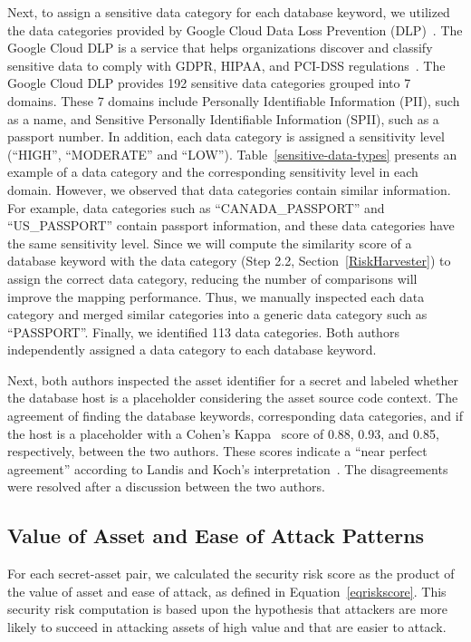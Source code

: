 Next, to assign a sensitive data category for each database keyword, we utilized the data categories provided by Google Cloud Data Loss Prevention (DLP)~\cite{google-dlp}. The Google Cloud DLP is a service that helps organizations discover and classify sensitive data to comply with GDPR, HIPAA, and PCI-DSS regulations~\cite{google-dlp}. The Google Cloud DLP provides 192 sensitive data categories grouped into 7 domains. These 7 domains include Personally Identifiable Information (PII), such as a name, and Sensitive Personally Identifiable Information (SPII), such as a passport number. In addition, each data category is assigned a sensitivity level (``HIGH'', ``MODERATE'' and ``LOW''). Table~\ref{sensitive-data-types} presents an example of a data category and the corresponding sensitivity level in each domain. However, we observed that data categories contain similar information. For example, data categories such as ``CANADA\_PASSPORT'' and ``US\_PASSPORT'' contain passport information, and these data categories have the same sensitivity level. Since we will compute the similarity score of a database keyword with the data category (Step 2.2, Section~\ref{RiskHarvester}) to assign the correct data category, reducing the number of comparisons will improve the mapping performance. Thus, we manually inspected each data category and merged similar categories into a generic data category such as ``PASSPORT''. Finally, we identified 113 data categories. Both authors independently assigned a data category to each database keyword.   



Next, both authors inspected the asset identifier for a secret and labeled whether the database host is a placeholder considering the asset source code context. The agreement of finding the database keywords, corresponding data categories, and if the host is a placeholder with a Cohen's Kappa~\cite{cohen-kappa} score of 0.88, 0.93, and 0.85, respectively, between the two authors. These scores indicate a ``near perfect agreement'' according to Landis and Koch's interpretation~\cite{landis-koch}. The disagreements were resolved after a discussion between the two authors.


\subsection{Value of Asset and Ease of Attack Patterns} \label{Patterns}

For each secret-asset pair, we calculated the security risk score as the product of the value of asset and ease of attack, as defined in Equation~\ref{eqriskscore}. This security risk computation is based upon the hypothesis that attackers are more likely to succeed in attacking assets of high value and that are easier to attack.


